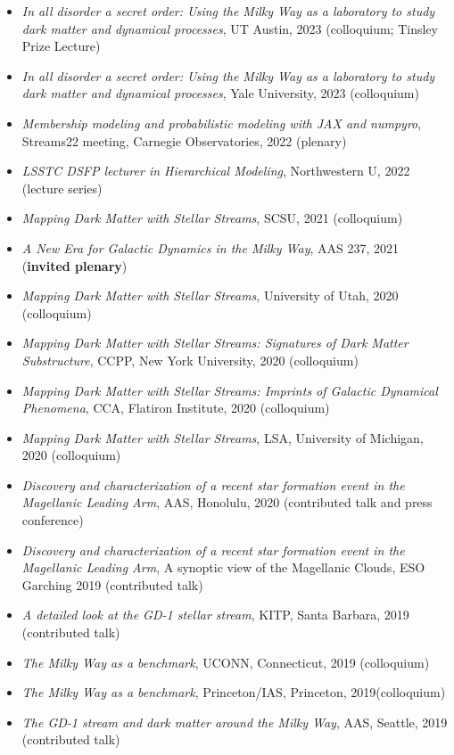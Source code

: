 \documentclass[12pt, letterpaper]{apw-cv}
\begin{document}
\begin{itemize}
    \item \emph{In all disorder a secret order: Using the Milky Way as a laboratory to study dark matter and dynamical processes}, UT Austin, 2023 (colloquium; Tinsley Prize Lecture)
    \item \emph{In all disorder a secret order: Using the Milky Way as a laboratory to study dark matter and dynamical processes}, Yale University, 2023 (colloquium)
    \item \emph{Membership modeling and probabilistic modeling with JAX and numpyro}, Streams22 meeting, Carnegie Observatories, 2022 (plenary)
    \item \emph{LSSTC DSFP lecturer in Hierarchical Modeling}, Northwestern U, 2022 (lecture series)
    \item \emph{Mapping Dark Matter with Stellar Streams}, SCSU, 2021 (colloquium)
    \item \emph{A New Era for Galactic Dynamics in the Milky Way}, AAS 237, 2021 (\textbf{invited plenary})
    \item \emph{Mapping Dark Matter with Stellar Streams}, University of Utah, 2020 (colloquium)
    \item \emph{Mapping Dark Matter with Stellar Streams: Signatures of Dark Matter Substructure}, CCPP, New York University, 2020 (colloquium)
    \item \emph{Mapping Dark Matter with Stellar Streams: Imprints of Galactic Dynamical Phenomena}, CCA, Flatiron Institute, 2020 (colloquium)
    \item \emph{Mapping Dark Matter with Stellar Streams}, LSA, University of Michigan, 2020 (colloquium)
    \item \emph{Discovery and characterization of a recent star formation event in the Magellanic Leading Arm}, AAS, Honolulu, 2020 (contributed talk and press conference)
    \item \emph{Discovery and characterization of a recent star formation event in the Magellanic Leading Arm}, A synoptic view of the Magellanic Clouds, ESO Garching 2019 (contributed talk)
    \item \emph{A detailed look at the GD-1 stellar stream}, KITP, Santa Barbara, 2019 (contributed talk)
    \item \emph{The Milky Way as a benchmark}, UCONN, Connecticut, 2019 (colloquium)
    \item \emph{The Milky Way as a benchmark}, Princeton/IAS, Princeton, 2019(colloquium)
    \item \emph{The GD-1 stream and dark matter around the Milky Way}, AAS, Seattle, 2019 (contributed talk)

\end{itemize}
\end{document}
